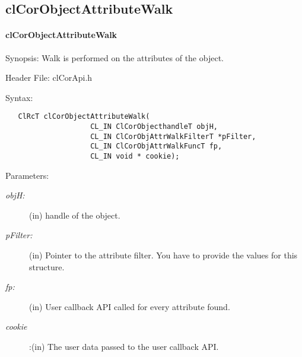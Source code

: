 \begin{flushleft}
\subsection{clCorObjectAttributeWalk}
\hypertarget{pagecor108}{}\paragraph{cl\-Cor\-Object\-Attribute\-Walk}\label{pagecor108}
\begin{Desc}
\item[Synopsis:]Walk is performed on the attributes of the object.\end{Desc}
\begin{Desc}
\item[Header File:]clCorApi.h\end{Desc}
\begin{Desc}
\item[Syntax:]

\footnotesize\begin{verbatim}   ClRcT clCorObjectAttributeWalk( 
					CL_IN ClCorObjecthandleT objH, 
					CL_IN ClCorObjAttrWalkFilterT *pFilter, 
					CL_IN ClCorObjAttrWalkFuncT fp, 
					CL_IN void * cookie); 
\end{verbatim}
\normalsize
\end{Desc}




\begin{Desc}
\item[Parameters:]
\begin{description}
\item[{\em obj\-H:}](in) handle of the object.
\item[{\em p\-Filter:}](in) Pointer to the attribute filter. You have to provide the values for this structure.
\item[{\em fp:}](in) User callback API called for every attribute found.
\item[{\em cookie}]:(in) The user data passed to the user callback API.
\end{description}
\end{Desc}



\end{flushleft}
